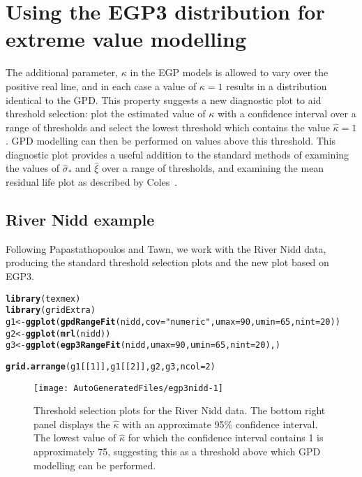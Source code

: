 \documentclass[a4paper]{article}\usepackage[]{graphicx}\usepackage[]{color}
\makeatletter
\def\maxwidth{ %
  \ifdim\Gin@nat@width>\linewidth
    \linewidth
  \else
    \Gin@nat@width
  \fi
}
\newcommand{\hlnum}[1]{\textcolor[rgb]{0.686,0.059,0.569}{#1}}%
\newcommand{\hlstr}[1]{\textcolor[rgb]{0.192,0.494,0.8}{#1}}%
\newcommand{\hlstd}[1]{\textcolor[rgb]{0.345,0.345,0.345}{#1}}%
\newcommand{\hlkwb}[1]{\textcolor[rgb]{0.69,0.353,0.396}{#1}}%
\newcommand{\hlkwc}[1]{\textcolor[rgb]{0.333,0.667,0.333}{#1}}%
\newcommand{\hlkwd}[1]{\textcolor[rgb]{0.737,0.353,0.396}{\textbf{#1}}}%
\newenvironment{kframe}{%
 \def\at@end@of@kframe{}%
 \ifinner\ifhmode%
  \def\at@end@of@kframe{\end{minipage}}%
  \begin{minipage}{\columnwidth}%
 \fi\fi%
 \def\FrameCommand##1{\hskip\@totalleftmargin \hskip-\fboxsep
 \colorbox{shadecolor}{##1}\hskip-\fboxsep
     \hskip-\linewidth \hskip-\@totalleftmargin \hskip\columnwidth}%
 \MakeFramed {\advance\hsize-\width
   \@totalleftmargin\z@ \linewidth\hsize
   \@setminipage}}%
 {\par\unskip\endMakeFramed%
 \at@end@of@kframe}
\newenvironment{knitrout}{}{} %
\makeatother
\begin{document}
\section{Using the EGP3 distribution for extreme value modelling}
The additional parameter, $\kappa$ in the EGP models is allowed to vary
over the positive real line, and in each case a value of $\kappa = 1$ results in
a distribution identical to the GPD. This property suggests a new diagnostic
plot to aid threshold selection: plot the estimated value of $\kappa$ with a
confidence interval over a range of thresholds and select the lowest threshold
which contains the value $\hat\kappa = 1$. GPD modelling can then be performed
on values above this threshold.
This diagnostic plot provides a useful addition to the standard methods of
examining the values of $\hat\sigma_*$ and $\hat\xi$ over a range of thresholds,
and examining the mean residual life plot as described by Coles~\cite{coles}.

\subsection{River Nidd example}
Following Papastathopoulos and Tawn, we work with the River Nidd data, producing
the standard threshold selection plots and the new plot based on EGP3.

\begin{knitrout}
\color{fgcolor}\begin{kframe}
\begin{alltt}
\hlkwd{library}\hlstd{(texmex)}
\hlkwd{library}\hlstd{(gridExtra)}
\hlstd{g1} \hlkwb{<-} \hlkwd{ggplot}\hlstd{(}\hlkwd{gpdRangeFit}\hlstd{(nidd,} \hlkwc{cov}\hlstd{=}\hlstr{"numeric"}\hlstd{,} \hlkwc{umax}\hlstd{=}\hlnum{90}\hlstd{,} \hlkwc{umin}\hlstd{=}\hlnum{65}\hlstd{,} \hlkwc{nint}\hlstd{=}\hlnum{20}\hlstd{))}
\hlstd{g2} \hlkwb{<-} \hlkwd{ggplot}\hlstd{(}\hlkwd{mrl}\hlstd{(nidd))}
\hlstd{g3} \hlkwb{<-} \hlkwd{ggplot}\hlstd{(}\hlkwd{egp3RangeFit}\hlstd{(nidd,} \hlkwc{umax}\hlstd{=}\hlnum{90}\hlstd{,} \hlkwc{umin}\hlstd{=}\hlnum{65}\hlstd{,} \hlkwc{nint}\hlstd{=}\hlnum{20}\hlstd{),)}

\hlkwd{grid.arrange}\hlstd{(g1[[}\hlnum{1}\hlstd{]],g1[[}\hlnum{2}\hlstd{]],g2,g3,}\hlkwc{ncol}\hlstd{=}\hlnum{2}\hlstd{)}
\end{alltt}
\end{kframe}\begin{figure}
\texttt{[image: AutoGeneratedFiles/egp3nidd-1]} \caption[Threshold selection plots for the River Nidd data]{Threshold selection plots for the River Nidd data. The bottom right panel displays the $\hat\kappa$ with an approximate 95\% confidence interval. The lowest value of $\hat\kappa$ for which the confidence interval contains 1 is approximately 75, suggesting this as a threshold above which GPD modelling can be performed.}\label{fig:nidd}
\end{figure}


\end{knitrout}
\end{document}
